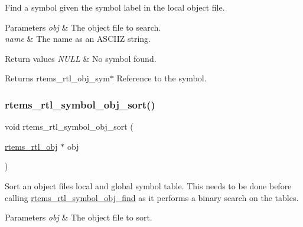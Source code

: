 Find a symbol given the symbol label in the local object file.


\begin{DoxyParams}{Parameters}
{\em obj} & The object file to search. \\
\hline
{\em name} & The name as an A\+S\+C\+I\+IZ string. \\
\hline
\end{DoxyParams}

\begin{DoxyRetVals}{Return values}
{\em N\+U\+LL} & No symbol found. \\
\hline
\end{DoxyRetVals}
\begin{DoxyReturn}{Returns}
rtems\+\_\+rtl\+\_\+obj\+\_\+sym$\ast$ Reference to the symbol. 
\end{DoxyReturn}
\mbox{\label{rtl-sym_8h_a450818df431a0b6254e933f45497c281}} 
\subsubsection{\texorpdfstring{rtems\_rtl\_symbol\_obj\_sort()}{rtems\_rtl\_symbol\_obj\_sort()}}
{\footnotesize\ttfamily void rtems\+\_\+rtl\+\_\+symbol\+\_\+obj\+\_\+sort (\begin{DoxyParamCaption}\item[{\mbox{\hyperlink{structrtems__rtl__obj}{rtems\+\_\+rtl\+\_\+obj}} $\ast$}]{obj }\end{DoxyParamCaption})}

Sort an object file\textquotesingle{}s local and global symbol table. This needs to be done before calling \mbox{\hyperlink{rtl-sym_8c_a98e04c5083c6560c69802ee44b839459}{rtems\+\_\+rtl\+\_\+symbol\+\_\+obj\+\_\+find}} as it performs a binary search on the tables.


\begin{DoxyParams}{Parameters}
{\em obj} & The object file to sort. \\
\hline
\end{DoxyParams}
\mbox{\label{rtl-sym_8h_ac18c51aca9023a082b359e672c8838e6}} 
